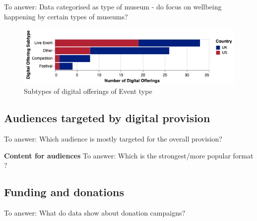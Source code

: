 \documentclass{egpubl}
\begin{document}
\color{red}To answer: Data  categorised  as  type of museum - do focus on wellbeing happening by certain types of museums?\color{black}

\begin{figure}[h]
  \centering
  \includegraphics[width=\linewidth]{images/event.png}
  \caption{\label{fig:DigOffType3} 
           Subtypes of digital offerings of Event type}
\end{figure}

\subsection{Audiences targeted by digital provision}
\label{targ}
\color{red}To answer: Which audience is mostly targeted for the overall provision?\color{black}




\noindent \textbf{Content for audiences}
\color{red}To answer: Which is the strongest/more popular format ?\color{black}




\subsection{Funding and donations}
\label{don}
\color{red}To answer: What do data show about donation campaigns?\color{black}
\end{document}
